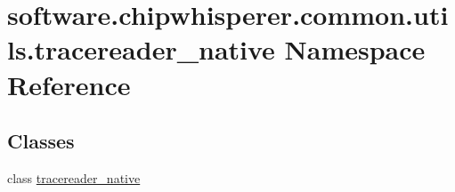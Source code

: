 \hypertarget{namespacesoftware_1_1chipwhisperer_1_1common_1_1utils_1_1tracereader__native}{}\section{software.\+chipwhisperer.\+common.\+utils.\+tracereader\+\_\+native Namespace Reference}
\label{namespacesoftware_1_1chipwhisperer_1_1common_1_1utils_1_1tracereader__native}
\subsection*{Classes}
\begin{DoxyCompactItemize}
\item 
class \hyperlink{classsoftware_1_1chipwhisperer_1_1common_1_1utils_1_1tracereader__native_1_1tracereader__native}{tracereader\+\_\+native}
\end{DoxyCompactItemize}
